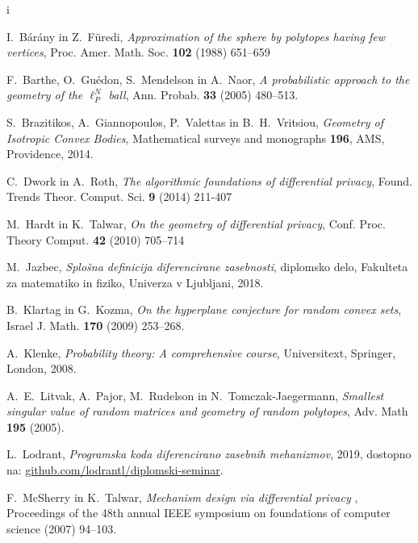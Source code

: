 i\documentclass[mat1]{fmfdelo}
\begin{document}
\begin{thebibliography}{99}

%
I.~Bárány in Z.~Füredi, \emph{Approximation of the sphere by polytopes having few vertices}, Proc. Amer. Math. Soc. \textbf{102} (1988) 651--659

%
F.~Barthe, O.~Gu\'edon, S.~Mendelson in A.~Naor, \emph{A probabilistic approach to the geometry of the $\ell_P^N$ ball}, Ann. Probab. \textbf{33} (2005) 480--513. %

%
S.~Brazitikos, A.~Giannopoulos, P.~Valettas in B.~H.~Vritsiou, \emph{Geometry of Isotropic
Convex Bodies}, Mathematical surveys and monographs \textbf{196}, AMS, Providence, 2014.

%
C.~Dwork in A.~Roth, \emph{The algorithmic foundations
of differential privacy}, Found. Trends Theor. Comput. Sci. \textbf{9} (2014) 211-407 %

M.~Hardt in K.~Talwar, \emph{On the geometry of differential privacy}, Conf. Proc. Theory Comput. \textbf{42} (2010) 705--714

M.~Jazbec, \emph{Splošna definicija diferencirane zasebnosti}, diplomsko delo, Fakulteta za matematiko in fiziko, Univerza v Ljubljani, 2018. %

B.~Klartag in G.~Kozma, \emph{On the hyperplane conjecture for random convex sets}, Israel J. Math. \textbf{170} (2009) 253--268. %

A.~Klenke, \emph{Probability theory: A comprehensive course}, Universitext, Springer, London, 2008.

A.~E.~Litvak, A.~Pajor, M.~Rudelson in N.~Tomczak-Jaegermann, \emph{Smallest singular value of random matrices and geometry of random polytopes}, Adv. Math \textbf{195} (2005).

L.~Lodrant, \emph{Programska koda diferencirano zasebnih mehanizmov}, 2019, dostopno na: \url{github.com/lodrantl/diplomski-seminar}.

F.~McSherry in K.~Talwar, \emph{Mechanism design via differential privacy
}, Proceedings of the 48th annual IEEE symposium on foundations of computer science (2007) 94--103.


\end{thebibliography}
\end{document}
